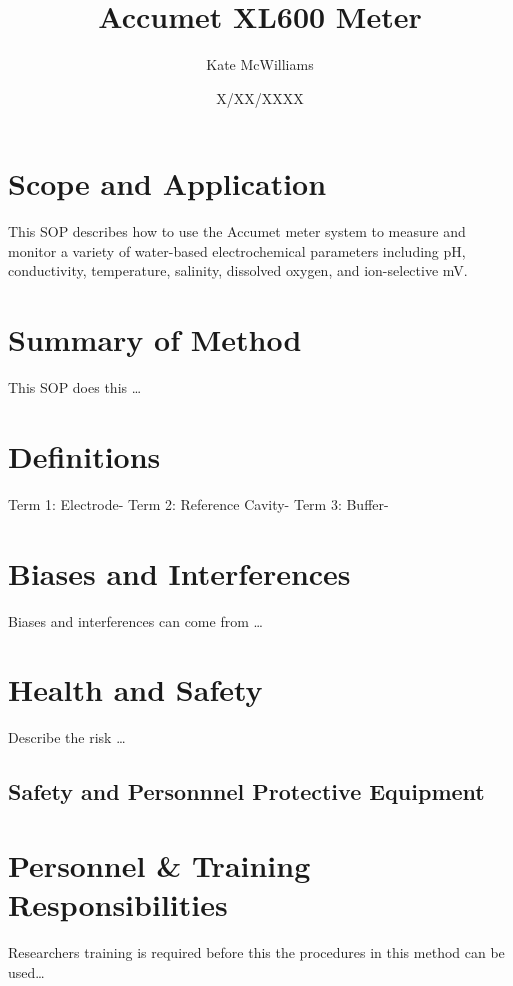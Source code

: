 \documentclass[12pt]{../SOP3_beta}\usepackage[]{graphicx}\usepackage[]{color}
\title{Accumet XL600 Meter}
\date{X/XX/XXXX}
\author{Kate McWilliams}
\begin{document}
\maketitle

\section{Scope and Application}

\NP This SOP describes how to use the Accumet meter system to measure and monitor a variety of water-based electrochemical parameters including pH, conductivity, temperature, salinity, dissolved oxygen, and ion-selective mV.

\section{Summary of Method}

\NP This SOP does this \dots

\tableofcontents

\newpage

\section{Definitions}

\NP Term 1: Electrode- 
\NP Term 2: Reference Cavity-
\NP Term 3: Buffer-

\section{Biases and Interferences}

\NP Biases and interferences can come from \dots

\section{Health and Safety}

\NP Describe the risk \dots


\subsection{Safety and Personnnel Protective Equipment}


\section{Personnel \& Training Responsibilities}

\NP Researchers training is required before this the procedures in this method can be used\dots 
\end{document}
